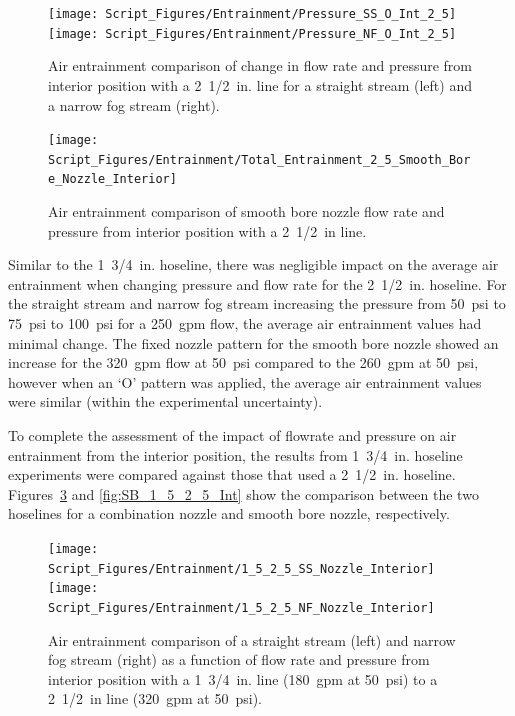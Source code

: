 \documentclass[12pt,oneside]{book}
\begin{document}
\begin{figure}[!ht]
\centering
\texttt{[image: Script\_Figures/Entrainment/Pressure\_SS\_O\_Int\_2\_5]}
\texttt{[image: Script\_Figures/Entrainment/Pressure\_NF\_O\_Int\_2\_5]}
\caption[Air Entrainment Comparison of Pressure and Flow Rate for Interior Combination Nozzle from 2~1/2~in. Line]{Air entrainment comparison of change in flow rate and pressure from interior position with a 2~1/2~in. line for a straight stream (left) and a narrow fog stream (right).}
\label{fig:SS_NF_FlowRate_Int_2_5}
\end{figure}

\begin{figure}[!ht]
\centering
\texttt{[image: Script\_Figures/Entrainment/Total\_Entrainment\_2\_5\_Smooth\_Bore\_Nozzle\_Interior]}
\caption[Air Entrainment Comparison of Exterior Smooth Bore Nozzle from 2~1/2~in. Line]{Air entrainment comparison of smooth bore nozzle flow rate and pressure from interior position with a 2~1/2~in line.}
\label{fig:SB_Flowrate_Int_2_5}
\end{figure}

\vskip15pt
Similar to the 1~3/4~in. hoseline, there was negligible impact on the average air entrainment when changing pressure and flow rate for the 2~1/2~in. hoseline. For the straight stream and narrow fog stream increasing the pressure from 50~psi to 75~psi to 100~psi for a 250~gpm flow, the average air entrainment values had minimal change. The fixed nozzle pattern for the smooth bore nozzle showed an increase for the 320~gpm flow at 50~psi compared to the 260~gpm at 50~psi, however when an `O' pattern was applied, the average air entrainment values were similar (within the experimental uncertainty).

To complete the assessment of the impact of flowrate and pressure on air entrainment from the interior position, the results from 1~3/4~in. hoseline experiments were compared against those that used a 2~1/2~in. hoseline. Figures~\ref{fig:SS_NF_1_5_2_5_Int} and \ref{fig:SB_1_5_2_5_Int} show the comparison between the two hoselines for a combination nozzle and smooth bore nozzle, respectively.

\begin{figure}[!ht]
\centering
\texttt{[image: Script\_Figures/Entrainment/1\_5\_2\_5\_SS\_Nozzle\_Interior]}
\texttt{[image: Script\_Figures/Entrainment/1\_5\_2\_5\_NF\_Nozzle\_Interior]}
\caption[Air Entrainment Comparison of Interior Smooth Bore Nozzle from 1~3/4~in Line to 2~1/2~in. Line]{Air entrainment comparison of a straight stream (left) and narrow fog stream (right) as a function of flow rate and pressure from interior position with a 1~3/4~in. line (180~gpm at 50~psi) to a 2~1/2~in line (320~gpm at 50~psi).}
\label{fig:SS_NF_1_5_2_5_Int}
\end{figure}
\end{document}
